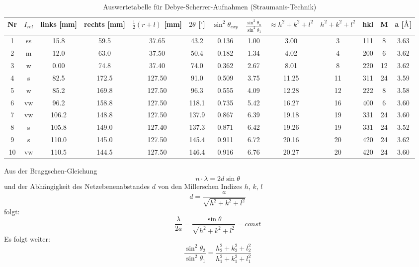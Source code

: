 \documentclass[a4paper,titlepage]{scrartcl}
\newcommand{\angstrom}{\mbox{\normalfont\AA}}
\numberwithin{equation}{section}
\begin{document}
\begin{table}
\begin{tabular}{|c|c|c|c|c|c|c|c|c|c|c|c|c|}
\hline
Nr & $I_{rel}$ & links [mm] & rechts [mm] & $\frac{1}{2}(r+l)$ [mm] & $2 \theta$ [$^{\circ}$] & $\sin^2{\theta_{exp}}$ & $\frac{\sin^2{\theta_n}}{\sin^2{\theta_1}}$ & $\approx h^2+k^2+l^2$ & $h^2+k^2+l^2$ & hkl & M & a [$\angstrom$]\\
\hline
1 & ss & 15.8 & 59.5 & 37.65 & 43.2 & 0.136 & 1.00 & 3.00 & 3 & 111 & 8 & 3.63 \\
2 & m & 12.0 & 63.0 & 37.50 & 50.4 & 0.182 & 1.34 & 4.02 & 4 & 200 & 6 & 3.62 \\
3 & w & 0.00 & 74.8 & 37.40 & 74.0 & 0.362 & 2.67 & 8.01 & 8 & 220 & 12 & 3.62 \\
4 & s & 82.5 & 172.5 & 127.50 & 91.0 & 0.509 & 3.75 & 11.25 & 11 & 311 & 24 & 3.59 \\
5 & w & 85.2 & 169.8 & 127.50 & 96.3 & 0.555 & 4.09 & 12.28 & 12 & 222 & 8 & 3.58 \\
6 & vw & 96.2 & 158.8 & 127.50 & 118.1 & 0.735 & 5.42 & 16.27 & 16 & 400 & 6 & 3.60 \\
7 & vw & 106.2 & 148.8 & 127.50 & 137.9 & 0.867 & 6.39 & 19.18 & 19 & 331 & 24 & 3.60 \\
8 & s & 105.8 & 149.0 & 127.40 & 137.3 & 0.871 & 6.42 & 19.26 & 19 & 331 & 24 & 3.52 \\
9 & s & 110.0 & 145.0 & 127.50 & 145.4 & 0.911 & 6.72 & 20.16 & 20 & 420 & 24 & 3.62 \\
10 & vw & 110.5 & 144.5 & 127.50 & 146.4 & 0.916 & 6.76 & 20.27 & 20 & 420 & 24 & 3.60 \\
\hline
\end{tabular}
\caption{Auswertetabelle für Debye-Scherrer-Aufnahmen (Straumanis-Technik)}
\label{tab:auswertetabelle}
\end{table}
Aus der Braggschen-Gleichung
\begin{equation*}
n \cdot \lambda = 2d \sin \theta
\end{equation*}
und der Abhängigkeit des Netzebenenabstandes $d$ von den Millerschen Indizes $h$, $k$, $l$
\begin{equation*}
d=\frac{a}{\sqrt{h^2+k^2+l^2}}
\end{equation*}
folgt:
\begin{equation}
\label{eq:derivationGitterkonstante}
\frac{\lambda}{2 a}=\frac{\sin \theta}{\sqrt{h^2+k^2+l^2}}=const
\end{equation}
Es folgt weiter:
\begin{equation*}
\frac{\sin^2 \theta_2}{\sin^2 \theta_1}=\frac{h_2^2+k_2^2+l_2^2}{h_1^2+k_1^2+l_1^2}
\end{equation*}
\end{document}
